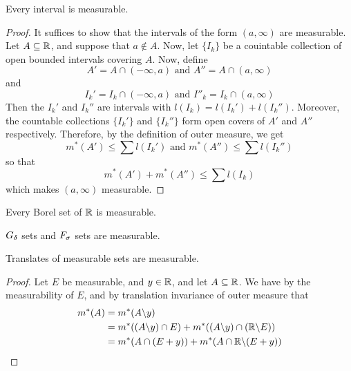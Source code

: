 \begin{lemma}\label{8.3.7}
    Every interval is measurable.
\end{lemma}
\begin{proof}
    It suffices to show that the intervals of the form $(a,\infty)$ are
    measurable. Let $A \subseteq \mathbb{R}$, and suppose that  $a \notin A$. Now, let
    $\{I_k\}$ be a couintable collection of open bounded intervals covering $A$.
    Now, define
    \begin{equation*}
        A'=A \cap (-\infty,a) \text{ and } A''=A \cap (a,\infty)
    \end{equation*}
    and
    \begin{equation*}
        I_k'=I_k \cap (-\infty,a) \text{ and } I''_k=I_k \cap (a,\infty)
    \end{equation*}
    Then the $I_k'$ and  $I_k''$ are intervals with $l(I_k)=l(I_k')+l(I_k'')$.
    Moreover, the countable collections $\{I_k'\}$ and $\{I_k''\}$ form open
    covers of $A'$ and  $A''$ respectively. Therefore, by the definition of
    outer measure, we get
    \begin{equation*}
        m^\ast(A') \leq \sum{l(I_k')} \text{ and } m^\ast(A'') \leq \sum{l(I_k'')}
    \end{equation*}
    so that
    \begin{equation*}
        m^\ast(A')+m^\ast(A'') \leq \sum{l(I_k)}
    \end{equation*}
    which makes $(a,\infty)$ measurable.
\end{proof}
\begin{corollary}
    Every Borel set of $\mathbb{R}$ is measurable.
\end{corollary}
\begin{corollary}
    $G_\delta$ sets and  $F_\sigma$ sets are measurable.
\end{corollary}

\begin{lemma}\label{8.3.8}
    Translates of measurable sets are measurable.
\end{lemma}
\begin{proof}
    Let $E$ be measurable, and  $y \in \mathbb{R}$, and let  $A \subseteq \mathbb{R}$. We have
    by the measurability of  $E$, and by translation invariance of outer measure
    that
    \begin{align*}
        m^\ast(A)   &=  m^\ast(A \backslash y)  \\
                 &=m^\ast((A \backslash y) \cap E)+m^\ast((A \backslash y) \cap
                     (\mathbb{R} \backslash E)) \\
                 &= m^\ast(A \cap (E+y))+m^\ast(A \cap \mathbb{R} \backslash (E+y))
    \end{align*}
\end{proof}

